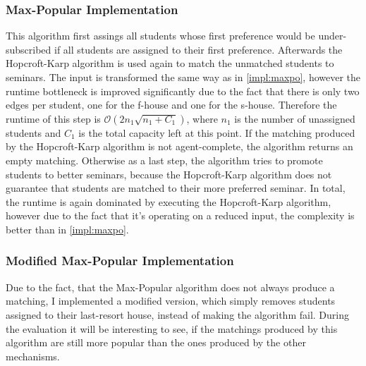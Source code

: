 \subsubsection{Max-Popular Implementation}
This algorithm first assings all students whose first preference would be under-subscribed if all students are assigned to their first preference. Afterwards the Hopcroft-Karp algorithm is used again to match the unmatched students to seminars. The input is transformed the same way as in \ref{impl:maxpo}, however the runtime bottleneck is improved significantly due to the fact that there is only two edges per student, one for the f-house and one for the s-house. Therefore the runtime of this step is $\mathcal{O}(2n_1\sqrt{n_1+C_1})$, where $n_1$ is the number of unassigned students and $C_1$ is the total capacity left at this point. If the matching produced by the Hopcroft-Karp algorithm is not agent-complete, the algorithm returns an empty matching. Otherwise as a last step, the algorithm tries to promote students to better seminars, because the Hopcroft-Karp algorithm does not guarantee that students are matched to their more preferred seminar. In total, the runtime is again dominated by executing the Hopcroft-Karp algorithm, however due to the fact that it's operating on a reduced input, the complexity is better than in \ref{impl:maxpo}.

\subsubsection{Modified Max-Popular Implementation}
Due to the fact, that the Max-Popular algorithm does not always produce a matching, I implemented a modified version, which simply removes students assigned to their last-resort house, instead of making the algorithm fail. During the evaluation it will be interesting to see, if the matchings produced by this algorithm are still more popular than the ones produced by the other mechanisms.

